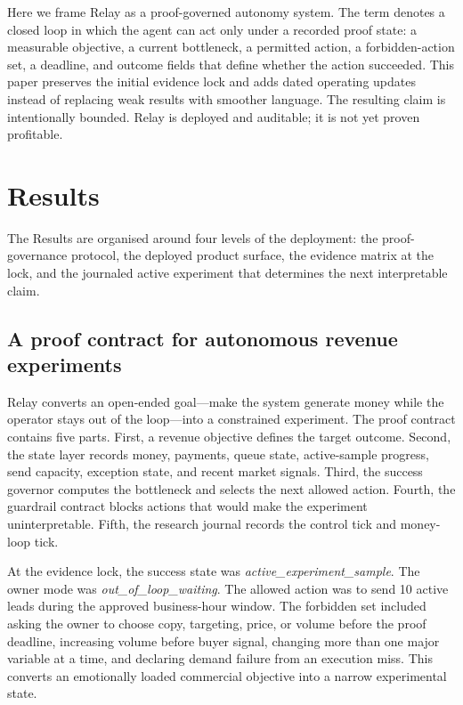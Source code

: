 \documentclass[12pt,letterpaper]{article}
\begin{document}
Here we frame Relay as a proof-governed autonomy system. The term denotes a closed loop in which the agent can act only under a recorded proof state: a measurable objective, a current bottleneck, a permitted action, a forbidden-action set, a deadline, and outcome fields that define whether the action succeeded. This paper preserves the initial evidence lock and adds dated operating updates instead of replacing weak results with smoother language. The resulting claim is intentionally bounded. Relay is deployed and auditable; it is not yet proven profitable.

\section{Results}

The Results are organised around four levels of the deployment: the proof-governance protocol, the deployed product surface, the evidence matrix at the lock, and the journaled active experiment that determines the next interpretable claim.

\subsection{A proof contract for autonomous revenue experiments}

Relay converts an open-ended goal---make the system generate money while the operator stays out of the loop---into a constrained experiment. The proof contract contains five parts. First, a revenue objective defines the target outcome. Second, the state layer records money, payments, queue state, active-sample progress, send capacity, exception state, and recent market signals. Third, the success governor computes the bottleneck and selects the next allowed action. Fourth, the guardrail contract blocks actions that would make the experiment uninterpretable. Fifth, the research journal records the control tick and money-loop tick.

At the evidence lock, the success state was \emph{active\_experiment\_sample}. The owner mode was \emph{out\_of\_loop\_waiting}. The allowed action was to send 10 active leads during the approved business-hour window. The forbidden set included asking the owner to choose copy, targeting, price, or volume before the proof deadline, increasing volume before buyer signal, changing more than one major variable at a time, and declaring demand failure from an execution miss. This converts an emotionally loaded commercial objective into a narrow experimental state.
\end{document}
